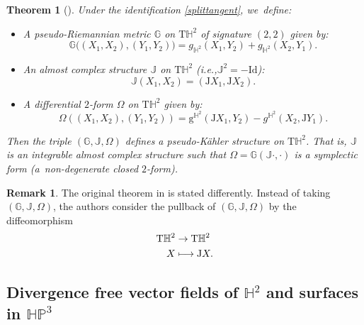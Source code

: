 \documentclass[11pt]{article}
\newcommand{\ie}{i.e.,\xspace}
\newcommand\mto{\mathchoice{\longmapsto}{\mapsto}{\mapsto}{\mapsto}}
\theoremstyle{plain}
\newtheorem{theorem}[cor]{Theorem}
\theoremstyle{definition}
\newtheorem{remark}[cor]{Remark}
\newcommand{\HP}{\mathbb{HP}^3}
\begin{document}
\begin{theorem}[\cite{canonical_pseudo}]\label{canonical_pseudo}
Under the identification \eqref{splittangent}, we~define:
\begin{itemize}
\item A pseudo-Riemannian metric $\mathbb{G}$ on $\mathrm{T}\mathbb{H}^2$ of signature $(2,2)$ given by:
\[
\mathbb{G}\big((X_1,X_2),(Y_1,Y_2)\big)=g_{\mathbb{H}^2}(X_1,Y_2)+g_{\mathbb{H}^2}(X_2,Y_1).
\]
\item An almost complex structure $\mathbb{J}$ on $\mathrm{T}\mathbb{H}^2$ (\ie $\mathbb{J}^2=-\mathrm{Id}$):
\[
\mathbb{J}(X_1,X_2)=(\mathrm{J}X_1,\mathrm{J}X_2).
\]
\item A differential $2$-form $\Omega$ on $\mathrm{T}\mathbb{H}^2$ given by:
\[
\Omega((X_1,X_2),(Y_1,Y_2))=\mathrm{g}^{\mathbb{H}^2}(\mathrm{J}X_1,Y_2)-g^{\mathbb{H}^{2}}(X_2,\mathrm{J}Y_1).
\]
\end{itemize}
Then the triple $(\mathbb{G},\mathbb{J},\Omega)$ defines a pseudo-Kähler structure on $\mathrm{T}\mathbb{H}^2$. That is, $\mathbb{J}$ is an integrable almost complex structure such that $\Omega=\mathbb{G}(\mathbb{J}\cdot,\cdot)$ is a symplectic form (a~non-degenerate closed $2$-form).
\end{theorem}
\begin{remark}
The original theorem in \cite{canonical_pseudo} is stated differently. Instead of taking $(\mathbb{G},\mathbb{J},\Omega)$, the authors consider the pullback of $(\mathbb{G},\mathbb{J},\Omega)$ by the diffeomorphism
\[
\begin{aligned}
\mathrm{T}\mathbb{H}^2 & \to \mathrm{T}\mathbb{H}^2 \\
X & \mto \mathrm{J}X.
\end{aligned}
\]
\end{remark}

\subsection{Divergence free vector fields of \texorpdfstring{$\mathbb{H}^2$}{H2}
and surfaces in \texorpdfstring{$\HP$}{HP}}
\end{document}
